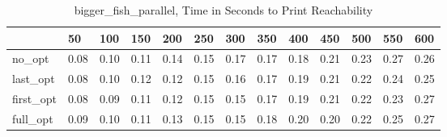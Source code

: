 \begin{table}
\caption{bigger\_fish\_parallel, Time in Seconds to Print Reachability}
\label{bigger_fish_parallel_states_time}
\begin{tabular}{lllllllllllll}
\toprule
 & 50 & 100 & 150 & 200 & 250 & 300 & 350 & 400 & 450 & 500 & 550 & 600 \\
\midrule
no\_opt & 0.08 & 0.10 & 0.11 & 0.14 & 0.15 & 0.17 & 0.17 & 0.18 & 0.21 & 0.23 & 0.27 & 0.26 \\
last\_opt & 0.08 & 0.10 & 0.12 & 0.12 & 0.15 & 0.16 & 0.17 & 0.19 & 0.21 & 0.22 & 0.24 & 0.25 \\
first\_opt & 0.08 & 0.09 & 0.11 & 0.12 & 0.15 & 0.15 & 0.17 & 0.19 & 0.21 & 0.22 & 0.23 & 0.27 \\
full\_opt & 0.09 & 0.10 & 0.11 & 0.13 & 0.15 & 0.15 & 0.18 & 0.20 & 0.20 & 0.22 & 0.25 & 0.27 \\
\bottomrule
\end{tabular}
\end{table}
